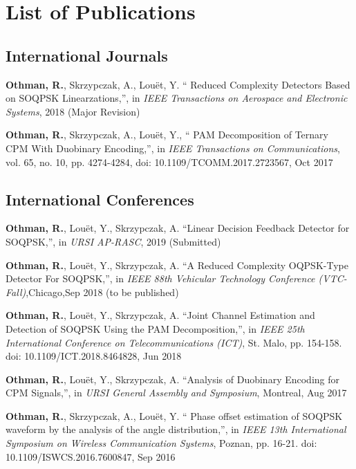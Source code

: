 \chapter*{List of Publications}
\section*{International Journals}
\renewcommand{\labelenumi}{[IJ-\arabic{enumi}]}
\begin{etaremune}%
	\item \textbf{Othman, R.}, Skrzypczak, A., Lou\"{e}t, Y. `` Reduced Complexity Detectors Based on SOQPSK Linearzations,'', in \emph{IEEE Transactions on Aerospace and Electronic Systems}, 2018 (Major Revision)
	\item \textbf{Othman, R.}, Skrzypczak, A., Lou\"{e}t, Y., `` PAM Decomposition of Ternary CPM With Duobinary Encoding,'', in \emph{IEEE Transactions on Communications}, vol. 65, no. 10, pp. 4274-4284, doi: 10.1109/TCOMM.2017.2723567, Oct 2017
\end{etaremune}

\section*{International Conferences}
\renewcommand{\labelenumi}{[IC-\arabic{enumi}]}
\begin{etaremune}
	\item \textbf{Othman, R.}, Lou\"{e}t, Y., Skrzypczak, A. ``Linear Decision Feedback Detector for SOQPSK,'', in \emph{URSI AP-RASC}, 2019 (Submitted)
	\item \textbf{Othman, R.}, Lou\"{e}t, Y., Skrzypczak, A. ``A Reduced Complexity OQPSK-Type Detector For SOQPSK,'', in \emph{IEEE 88th Vehicular Technology Conference (VTC-Fall)},Chicago,Sep 2018 (to be published)
	\item \textbf{Othman, R.}, Lou\"{e}t, Y., Skrzypczak, A. ``Joint Channel Estimation and Detection of SOQPSK Using the PAM Decomposition,'', in \emph{IEEE 25th International Conference on Telecommunications (ICT)}, St. Malo, pp. 154-158. doi: 10.1109/ICT.2018.8464828, Jun 2018 
\item \textbf{Othman, R.}, Lou\"{e}t, Y., Skrzypczak, A. ``Analysis of Duobinary Encoding for CPM Signals,'', in \emph{URSI General Assembly and Symposium}, Montreal, Aug 2017
\item \textbf{Othman, R.}, Skrzypczak, A., Lou\"{e}t, Y. `` Phase offset estimation of SOQPSK waveform by the analysis of the angle distribution,'', in \emph{IEEE 13th International Symposium on Wireless Communication Systems}, Poznan, pp. 16-21. doi: 10.1109/ISWCS.2016.7600847, Sep 2016  
\end{etaremune}

